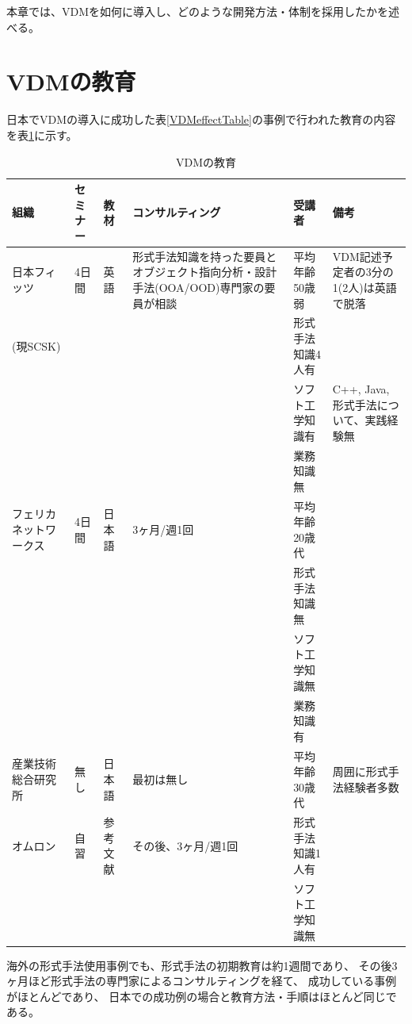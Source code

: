 本章では、VDMを如何に導入し、どのような開発方法・体制を採用したかを述べる。

\section{VDMの教育}
	\label{Education}

	日本でVDMの導入に成功した表\ref{VDMeffectTable}の事例で行われた教育の内容を表\ref{VDMEducation}に示す。

\begin{table}[h]
	\caption[VDMの教育]{VDMの教育}
	\label{VDMEducation}
	\begin{center}
		\setlength{\tabcolsep}{3pt}
		\begin{tabular}{|p{}|p{}|p{}|p{}|p{}|p{}|} \hline
			組織 & セミナー & 教材 & コンサルティング & 受講者 & 備考 \\ \hline\hline

			日本フィッツ & 4日間 & 英語 & 
				形式手法知識を持った要員とオブジェクト指向分析・設計手法(OOA/OOD)専門家の要員が相談 & 
				平均年齢50歳弱 & VDM記述予定者の3分の1(2人)は英語で脱落 \\ 
				(現SCSK) & & & & 形式手法知識4人有 & \\ 
				 &  & & & ソフト工学知識有 & C++, Java, 形式手法について、実践経験無 \\ 
				 &  & & & 業務知識無 & \\ \hline

			フェリカネットワークス & 4日間 &  日本語 & 3ヶ月/週1回 & 平均年齢20歳代 & \\ 
				 & & & & 形式手法知識無 & \\ 
				 & & & & ソフト工学知識無 & \\ 
				 & & & & 業務知識有 & \\ \hline
			産業技術総合研究所 & 無し & 日本語 & 最初は無し & 平均年齢30歳代 & 周囲に形式手法経験者多数 \\ 
				オムロン & 自習 & 参考文献 \cite{Sakoh2010} \cite{Sahara2008} & その後、3ヶ月/週1回 & 形式手法知識1人有 & \\ 
				 & & & & ソフト工学知識無 & \\ \hline
		\end{tabular}
	\end{center}
\end{table}

海外の形式手法使用事例でも、形式手法の初期教育は約1週間であり、
その後3ヶ月ほど形式手法の専門家によるコンサルティングを経て、
成功している事例がほとんどであり\cite{SEC2012FMREPORT}、
日本での成功例の場合と教育方法・手順はほとんど同じである。

